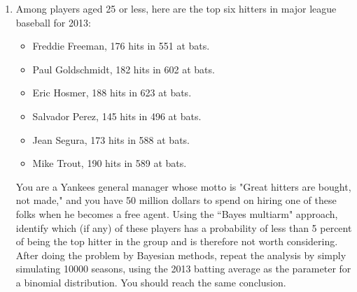 \documentclass[12pt]{article}
\begin{document}
\begin{enumerate}
\item Among players aged 25 or less, here are the top six hitters in major league baseball for 2013:
\begin{itemize}
\item Freddie Freeman, 176 hits in 551 at bats.
\item Paul Goldschmidt, 182 hits in 602 at bats.
\item Eric Hosmer, 188 hits in 623 at bats.
\item Salvador Perez, 145 hits in 496 at bats.
\item Jean Segura, 173 hits in 588 at bats.
\item Mike Trout, 190 hits in 589 at bats.
\end{itemize}

You are a Yankees general manager whose motto is "Great hitters are bought, not made," and you have 50 million dollars to spend on hiring one of these folks when he becomes a free agent. Using the ``Bayes multiarm" approach, identify which (if any) of these players has a probability of less than 5 percent of being the top hitter in the group and is therefore not worth considering. After doing the problem by Bayesian methods, repeat the analysis by simply simulating 10000 seasons, using the 2013 batting average as the parameter for a binomial distribution. You should reach the same conclusion.



\end{enumerate}









\pagebreak
\end{document}
